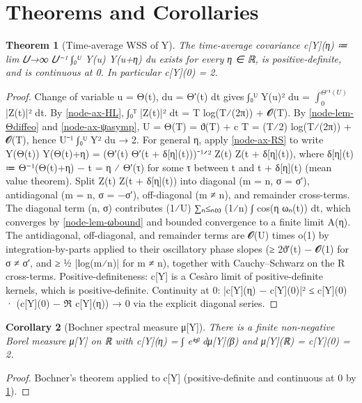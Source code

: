 \documentclass[11pt]{article}
\newtheorem{theorem}{Theorem}
\newtheorem{corollary}[theorem]{Corollary}
\theoremstyle{definition}
\begin{document}
\section*{Theorems and Corollaries}
\begin{theorem}[{Time-average WSS of Y}]\label{node-thm-WSS}
The time-average covariance c[Y](η) ≔ lim 𝑈→∞ 𝑈⁻¹ ∫₀ᵁ Y(u) Y(u+η) du exists for every η ∈ ℝ, is positive-definite, and is continuous at 0. In particular c[Y](0) = 2.
\end{theorem}
\begin{proof}
Change of variable u = Θ(t), du = Θ′(t) dt gives ∫₀ᵁ Y(u)² du = \(\int_{0}^{Θ⁻¹(U)}\) |Z(t)|² dt. By \ref{node-ax-HL}, ∫₀ᵀ |Z(t)|² dt = T log(T⁄(2π)) + 𝓞(T). By \ref{node-lem-Θdiffeo} and \ref{node-ax-ψasymp}, U = Θ(T) = ϑ(T) + c T = (T⁄2) log(T⁄(2π)) + 𝓞(T), hence U⁻¹ ∫₀ᵁ Y² du → 2. For general η, apply \ref{node-ax-RS} to write Y(Θ(t)) Y(Θ(t)+η) = (Θ′(t) Θ′(t + δ[η](t)))⁻¹ᐟ² Z(t) Z(t + δ[η](t)), where δ[η](t) ≔ Θ⁻¹(Θ(t)+η) − t = η ⁄ Θ′(τ) for some τ between t and t + δ[η](t) (mean value theorem). Split Z(t) Z(t + δ[η](t)) into diagonal (m = n, σ = σ′), antidiagonal (m = n, σ = −σ′), off-diagonal (m ≠ n), and remainder cross-terms. The diagonal term (n, σ) contributes (1⁄U) ∑ₙ≤ₙ₍ₜ₎ (1⁄n) ∫ cos(η ωₙ(t)) dt, which converges by \ref{node-lem-ωbound} and bounded convergence to a finite limit A(η). The antidiagonal, off-diagonal, and remainder terms are 𝓞(U) times o(1) by integration-by-parts applied to their oscillatory phase slopes (≥ 2ϑ′(t) − 𝓞(1) for σ ≠ σ′, and ≥ ½ |log(m⁄n)| for m ≠ n), together with Cauchy–Schwarz on the R cross-terms. Positive-definiteness: c[Y] is a Cesàro limit of positive-definite kernels, which is positive-definite. Continuity at 0: |c[Y](η) − c[Y](0)|² ≤ c[Y](0) · (c[Y](0) − ℜ c[Y](η)) → 0 via the explicit diagonal series.
\end{proof}

\begin{corollary}[{Bochner spectral measure μ[Y]}]\label{node-cor-Bochner}
There is a finite non-negative Borel measure μ[Y] on ℝ with c[Y](η) = ∫ eⁱᵑᵝ dμ[Y](β) and μ[Y](ℝ) = c[Y](0) = 2.
\end{corollary}
\begin{proof}
Bochner's theorem applied to c[Y] (positive-definite and continuous at 0 by \ref{node-thm-WSS}).
\end{proof}
\end{document}
